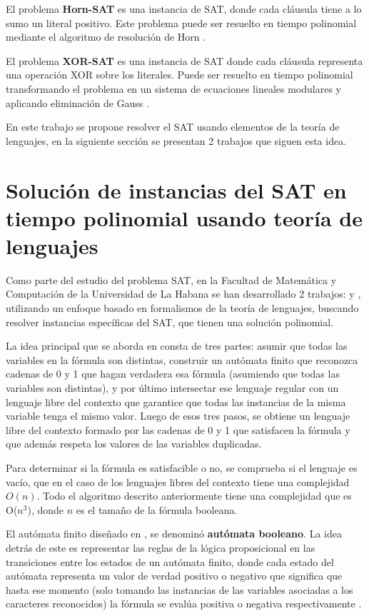 El problema \textbf{Horn-SAT} es una instancia de SAT, donde cada cláusula tiene a lo sumo un literal positivo.  Este problema puede ser resuelto en tiempo polinomial mediante el algoritmo de resolución de Horn \cite{hornsatbib}.

El problema \textbf{XOR-SAT} es una instancia de SAT donde cada cláusula representa una operación XOR sobre los literales. Puede ser resuelto en tiempo polinomial transformando el problema en un sistema de ecuaciones lineales modulares y aplicando eliminación de Gauss \cite{xorsatbib}.

En este trabajo se propone resolver el SAT usando elementos de la teoría de lenguajes, en la siguiente sección se 
presentan 2 trabajos que siguen esta idea.

\section{Solución de instancias del SAT en tiempo polinomial usando teoría de lenguajes}

Como parte del estudio del problema SAT, en la Facultad de Matemática y Computación de la Universidad de La Habana
se han desarrollado 2 trabajos: \cite{aCFSAT} y \cite{aSRCSAT}, utilizando un enfoque basado en formalismos de la teoría de lenguajes, buscando resolver 
instancias específicas del SAT, que tienen una solución polinomial.

La idea principal que se aborda en \cite{aCFSAT} consta de tres partes: asumir que todas las variables en la fórmula son distintas, construir un autómata finito que reconozca cadenas de 0 y 1 que hagan verdadera esa fórmula (asumiendo que todas las variables son distintas), y por último intersectar ese lenguaje regular con un lenguaje libre del contexto que garantice que todas las instancias de la misma variable tenga el mismo valor. Luego de esos tres pasos, se obtiene un lenguaje libre del contexto formado por las cadenas de 0 y 1 que satisfacen la fórmula y que además respeta los valores de las variables duplicadas.

Para determinar si la fórmula es satisfacible o no, se comprueba si el lenguaje es vacío, que en el caso de los lenguajes libres del contexto tiene una complejidad $O(n)$. Todo el algoritmo descrito anteriormente tiene una complejidad que es O($n^3$), donde $n$ es el tamaño de la fórmula booleana.

El autómata finito diseñado en \cite{aCFSAT}, se denominó \textbf{autómata booleano}. La idea detrás de este es representar las reglas de la lógica proposicional en las transiciones entre los estados de un autómata finito, donde cada estado del autómata representa un valor de verdad positivo o negativo que significa que hasta ese momento (solo tomando las instancias de las variables asociadas a los caracteres reconocidos) la fórmula se evalúa positiva o negativa respectivamente \cite{aCFSAT}.

